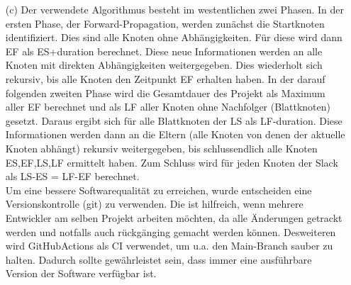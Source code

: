 \documentclass[12pt]{scrartcl}
\begin{document}


    \begin{enumerate}
        \item[(c)]{Der verwendete Algorithmus besteht im westentlichen zwei Phasen. In der ersten Phase, der Forward-Propagation, werden
        zunächst die Startknoten identifiziert. Dies sind alle Knoten ohne Abhängigkeiten. Für diese wird dann EF als ES+duration berechnet. Diese neue Informationen werden an alle Knoten mit direkten Abhängigkeiten weitergegeben. Dies wiederholt sich rekursiv, bis alle Knoten den Zeitpunkt EF erhalten haben. In der darauf folgenden zweiten Phase wird die Gesamtdauer des Projekt als Maximum aller EF berechnet und als LF aller Knoten ohne Nachfolger (Blattknoten) gesetzt. Daraus ergibt sich für alle Blattknoten der LS als LF-duration. Diese Informationen werden dann an die Eltern (alle Knoten von denen der aktuelle Knoten abhängt) rekursiv weitergegeben, bis schlussendlich alle Knoten ES,EF,LS,LF ermittelt haben. Zum Schluss wird für jeden Knoten der Slack als LS-ES = LF-EF berechnet. 
        \\
        Um eine bessere Softwarequalität zu erreichen, wurde entscheiden eine Versionskontrolle (git) zu verwenden. Die ist hilfreich, wenn mehrere Entwickler am selben Projekt arbeiten möchten, da alle Änderungen getrackt werden und notfalls auch rückgänging gemacht werden können. Desweiteren wird GitHubActions als CI verwendet, um u.a. den Main-Branch sauber zu halten. Dadurch sollte gewährleistet sein, dass immer eine ausführbare Version der Software verfügbar ist.
        }
    \end{enumerate}
\end{document}
